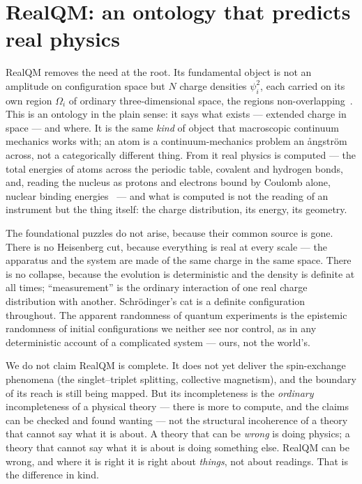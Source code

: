\documentclass[11pt]{article}
\begin{document}
\section{RealQM: an ontology that predicts real physics}

RealQM removes the need at the root. Its fundamental object is not an amplitude on configuration space but $N$
charge densities $\psi_i^2$, each carried on its own region $\Omega_i$ of ordinary three-dimensional space,
the regions non-overlapping~\cite{Ontology}. This is an ontology in the plain sense: it says what exists ---
extended charge in space --- and where. It is the same \emph{kind} of object that macroscopic continuum
mechanics works with; an atom is a continuum-mechanics problem an \aa ngstr\"om across, not a categorically
different thing. From it real physics is computed --- the total energies of atoms across the periodic table,
covalent and hydrogen bonds, and, reading the nucleus as protons and electrons bound by Coulomb alone, nuclear
binding energies~\cite{RealQM} --- and what is computed is not the reading of an instrument but the thing
itself: the charge distribution, its energy, its geometry.

The foundational puzzles do not arise, because their common source is gone. There is no Heisenberg cut,
because everything is real at every scale --- the apparatus and the system are made of the same charge in the
same space. There is no collapse, because the evolution is deterministic and the density is definite at all
times; ``measurement'' is the ordinary interaction of one real charge distribution with another. Schr\"odinger's
cat is a definite configuration throughout. The apparent randomness of quantum experiments is the epistemic
randomness of initial configurations we neither see nor control, as in any deterministic account of a
complicated system --- ours, not the world's.

We do not claim RealQM is complete. It does not yet deliver the spin-exchange phenomena (the singlet--triplet
splitting, collective magnetism), and the boundary of its reach is still being mapped. But its incompleteness
is the \emph{ordinary} incompleteness of a physical theory --- there is more to compute, and the claims can be
checked and found wanting --- not the structural incoherence of a theory that cannot say what it is about. A
theory that can be \emph{wrong} is doing physics; a theory that cannot say what it is about is doing something
else. RealQM can be wrong, and where it is right it is right about \emph{things}, not about readings. That is
the difference in kind.
\end{document}
